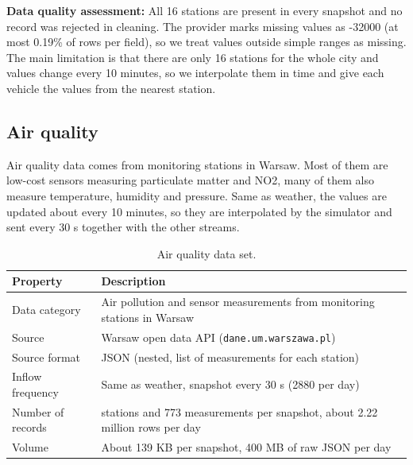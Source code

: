 \documentclass[11pt]{article}
\begin{document}
\noindent\textbf{Data quality assessment:}
All 16 stations are present in every snapshot and no record was rejected in cleaning. The provider marks missing values as -32000 (at most 0.19\% of rows per field), so we treat values outside simple ranges as missing. The main limitation is that there are only 16 stations for the whole city and values change every 10 minutes, so we interpolate them in time and give each vehicle the values from the nearest station.

\subsection{Air quality}

Air quality data comes from monitoring stations in Warsaw.
Most of them are low-cost sensors measuring particulate matter and NO2,
many of them also measure temperature, humidity and pressure.
Same as weather, the values are updated about every 10 minutes,
so they are interpolated by the simulator and sent every 30 s together with the other streams.

\begin{table}[H]
\centering
\caption{Air quality data set.}\label{tab:ds-air}
\begin{tabular}{|>{\raggedright\arraybackslash}p{3cm}|>{\raggedright\arraybackslash}p{11cm}|}
\hline
\textbf{Property} & \textbf{Description} \\
\hline
Data category & Air pollution and sensor measurements from monitoring stations in Warsaw \\ \hline
Source & Warsaw open data API (\texttt{dane.um.warszawa.pl}) \\ \hline
Source format & JSON (nested, list of measurements for each station) \\ \hline
Inflow frequency & Same as weather, snapshot every 30 s (2880 per day) \\ \hline
Number of records & 113 stations and 773 measurements per snapshot, about 2.22 million rows per day \\ \hline
Volume & About 139 KB per snapshot, 400 MB of raw JSON per day \\ \hline
\end{tabular}
\end{table}
\end{document}
